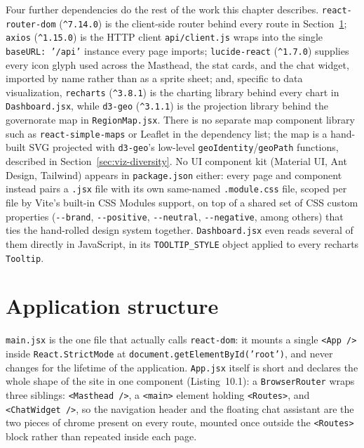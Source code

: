 \begin{sloppypar}
Four further dependencies do the rest of the work this chapter describes. \texttt{react-router-dom} (\texttt{\textasciicircum7.14.0}) is the client-side router behind every route in Section~\ref{sec:app-structure}; \texttt{axios} (\texttt{\textasciicircum1.15.0}) is the HTTP client \texttt{api/\allowbreak client.js} wraps into the single \texttt{baseURL: '/api'} instance every page imports; \texttt{lucide-react} (\texttt{\textasciicircum1.7.0}) supplies every icon glyph used across the Masthead, the stat cards, and the chat widget, imported by name rather than as a sprite sheet; and, specific to data visualization, \texttt{recharts} (\texttt{\textasciicircum3.8.1}) is the charting library behind every chart in \texttt{Dashboard.jsx}, while \texttt{d3-geo} (\texttt{\textasciicircum3.1.1}) is the projection library behind the governorate map in \texttt{RegionMap.jsx}. There is no separate map component library such as \texttt{react-simple-maps} or Leaflet in the dependency list; the map is a hand-built SVG projected with \texttt{d3-geo}'s low-level \texttt{geoIdentity}/\texttt{geoPath} functions, described in Section~\ref{sec:viz-diversity}. No UI component kit (Material UI, Ant Design, Tailwind) appears in \texttt{package.json} either: every page and component instead pairs a \texttt{.jsx} file with its own same-named \texttt{.module.css} file, scoped per file by Vite's built-in CSS Modules support, on top of a shared set of CSS custom properties (\texttt{-{}-brand}, \texttt{-{}-positive}, \texttt{-{}-neutral}, \texttt{-{}-negative}, among others) that ties the hand-rolled design system together. \texttt{Dashboard.jsx} even reads several of them directly in JavaScript, in its \texttt{TOOLTIP\_STYLE} object applied to every recharts \texttt{Tooltip}.
\end{sloppypar}

\section{Application structure}
\label{sec:app-structure}
\begin{sloppypar}
\texttt{main.jsx} is the one file that actually calls \texttt{react-dom}: it mounts a single \texttt{<App />} inside \texttt{React.StrictMode} at \texttt{document.getElementById('root')}, and never changes for the lifetime of the application. \texttt{App.jsx} itself is short and declares the whole shape of the site in one component (Listing~10.1): a \texttt{BrowserRouter} wraps three siblings: \texttt{<Masthead />}, a \texttt{<main>} element holding \texttt{<Routes>}, and \texttt{<ChatWidget />}, so the navigation header and the floating chat assistant are the two pieces of chrome present on every route, mounted once outside the \texttt{<Routes>} block rather than repeated inside each page.
\end{sloppypar}

